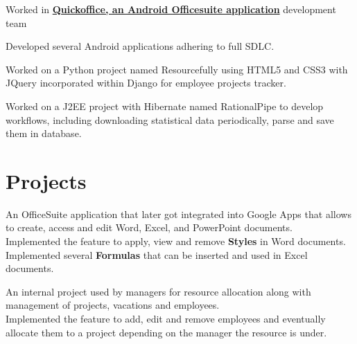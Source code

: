 \documentclass[a4paper]{srika-resume} %
\begin{document}
\begin{minipage}[t]{0.64\textwidth}
\sectionspace %



\begin{tightitemize}
\item Worked in \textbf{\href{https://en.wikipedia.org/wiki/Quickoffice}{Quickoffice, an Android Officesuite application}} development team
\item Developed several Android applications adhering to full SDLC.
\item Worked on a Python project named Resourcefully using HTML5 and CSS3 with JQuery incorporated within Django for employee projects tracker.
\item Worked on a J2EE project with Hibernate named RationalPipe to develop workflows, including downloading statistical data periodically, parse and save them in database. 
\end{tightitemize}

\sectionspace %


\section{Projects}


An OfficeSuite application that later got integrated into Google Apps that allows to
create, access and edit Word, Excel, and PowerPoint documents.\\
Implemented the feature to apply, view and remove \textbf{Styles} in Word documents. \\
Implemented several \textbf{Formulas} that can be inserted and used in Excel documents.

\sectionspace %



An internal project used by managers for resource allocation along with management of projects, vacations and employees.  \\
Implemented the feature to add, edit and remove employees and eventually allocate them to a project depending on the manager the resource is under.


\end{minipage}
\end{document}
